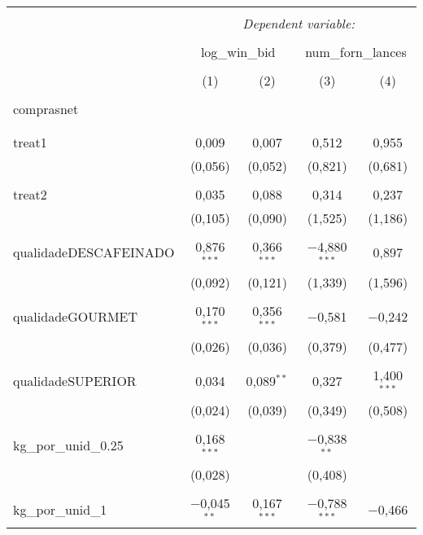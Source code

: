 
\begin{table}[!htbp] \centering 
  \caption{} 
  \label{} 
\begin{tabular}{@{\extracolsep{5pt}}lcccc} 
\\[-1.8ex]\hline 
\hline \\[-1.8ex] 
 & \multicolumn{4}{c}{\textit{Dependent variable:}} \\ 
\cline{2-5} 
\\[-1.8ex] & \multicolumn{2}{c}{log\_win\_bid} & \multicolumn{2}{c}{num\_forn\_lances} \\ 
\\[-1.8ex] & (1) & (2) & (3) & (4)\\ 
\hline \\[-1.8ex] 
 comprasnet &  &  &  &  \\ 
  &  &  &  &  \\ 
  & & & & \\ 
 treat1 & 0,009 & 0,007 & 0,512 & 0,955 \\ 
  & (0,056) & (0,052) & (0,821) & (0,681) \\ 
  & & & & \\ 
 treat2 & 0,035 & 0,088 & 0,314 & 0,237 \\ 
  & (0,105) & (0,090) & (1,525) & (1,186) \\ 
  & & & & \\ 
 qualidadeDESCAFEINADO & 0,876$^{***}$ & 0,366$^{***}$ & $-$4,880$^{***}$ & 0,897 \\ 
  & (0,092) & (0,121) & (1,339) & (1,596) \\ 
  & & & & \\ 
 qualidadeGOURMET & 0,170$^{***}$ & 0,356$^{***}$ & $-$0,581 & $-$0,242 \\ 
  & (0,026) & (0,036) & (0,379) & (0,477) \\ 
  & & & & \\ 
 qualidadeSUPERIOR & 0,034 & 0,089$^{**}$ & 0,327 & 1,400$^{***}$ \\ 
  & (0,024) & (0,039) & (0,349) & (0,508) \\ 
  & & & & \\ 
 kg\_por\_unid\_0.25 & 0,168$^{***}$ &  & $-$0,838$^{**}$ &  \\ 
  & (0,028) &  & (0,408) &  \\ 
  & & & & \\ 
 kg\_por\_unid\_1 & $-$0,045$^{**}$ & 0,167$^{***}$ & $-$0,788$^{***}$ & $-$0,466 \\ 

\end{tabular}
\end{table}
